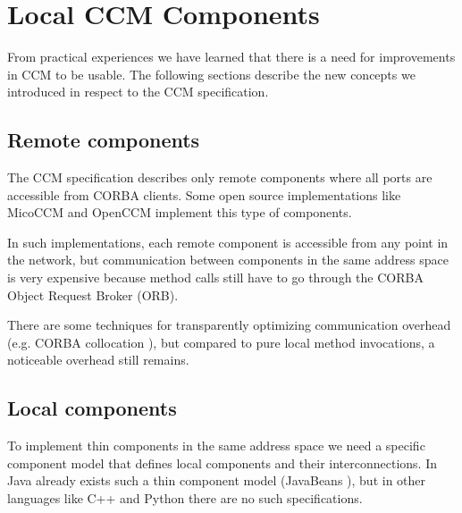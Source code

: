 \chapter{Local CCM Components}

From practical experiences we have learned that there is a need for improvements in
CCM to be usable. The following sections describe the new concepts 
\cite{TMKKW-EUROMICRO:2002,TKKKW-MIDDLEWARE:2003}
we introduced in respect to the CCM specification.


\section{Remote components}

The CCM specification describes only remote components where all ports are
accessible from CORBA clients. Some open source implementations like MicoCCM
\cite{MicoCCM} and OpenCCM \cite{MarvieMerle2001} implement this type of
components.

In such implementations, each remote component is accessible from any point in
the network, but communication between components in the same address space is
very expensive because method calls still have to go through the CORBA Object
Request Broker (ORB).

There are some techniques for transparently optimizing communication overhead
(e.g. CORBA collocation \cite{ObjectInterconnections18, wang00optimizing}), but
compared to pure local method invocations, a noticeable overhead still remains. 


\section{Local components}

To implement thin components in the same address space we need a specific
component model that defines local components and their interconnections. In
Java already exists such a thin component model (JavaBeans
\cite{Englander1997}), but in other languages like C++ and Python there are no
such specifications.

